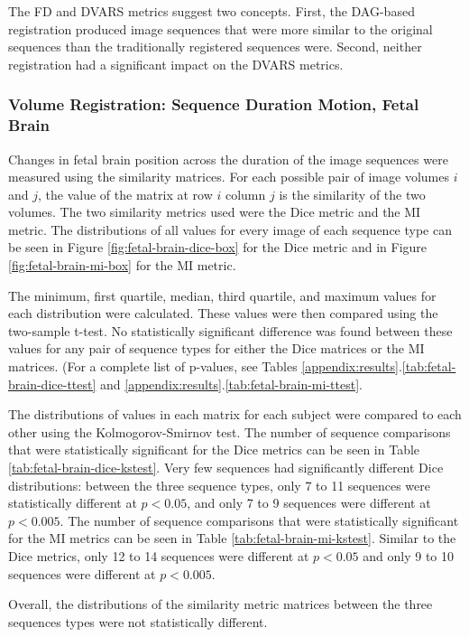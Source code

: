 The FD and DVARS metrics suggest two concepts. First, the DAG-based registration produced image sequences that were more similar to the original sequences than the traditionally registered sequences were. Second, neither registration had a significant impact on the DVARS metrics.

\subsubsection{Volume Registration: Sequence Duration Motion, Fetal Brain}

Changes in fetal brain position across the duration of the image sequences were measured using the similarity matrices. For each possible pair of image volumes $i$ and $j$, the value of the matrix at row $i$ column $j$ is the similarity of the two volumes. The two similarity metrics used were the Dice metric and the MI metric. The distributions of all values for every image of each sequence type can be seen in Figure \ref{fig:fetal-brain-dice-box} for the Dice metric and in Figure \ref{fig:fetal-brain-mi-box} for the MI metric.

The minimum, first quartile, median, third quartile, and maximum values for each distribution were calculated. These values were then compared using the two-sample t-test. No statistically significant difference was found between these values for any pair of sequence types for either the Dice matrices or the MI matrices. (For a complete list of p-values, see Tables \ref{appendix:results}.\ref{tab:fetal-brain-dice-ttest} and \ref{appendix:results}.\ref{tab:fetal-brain-mi-ttest}.

The distributions of values in each matrix for each subject were compared to each other using the Kolmogorov-Smirnov test. The number of sequence comparisons that were statistically significant for the Dice metrics can be seen in Table \ref{tab:fetal-brain-dice-kstest}. Very few sequences had significantly different Dice distributions: between the three sequence types, only 7 to 11 sequences were statistically different at $p < 0.05$, and only 7 to 9 sequences were different at $p < 0.005$. The number of sequence comparisons that were statistically significant for the MI metrics can be seen in Table \ref{tab:fetal-brain-mi-kstest}. Similar to the Dice metrics, only 12 to 14 sequences were different at $p < 0.05$ and only 9 to 10 sequences were different at $p < 0.005$.

Overall, the distributions of the similarity metric matrices between the three sequences types were not statistically different.


